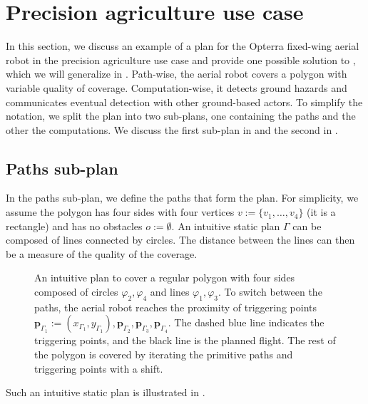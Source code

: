 \section{Precision agriculture use case}
\label{sec:flight-plan}

In this section, we discuss an example of a plan for the Opterra fixed-wing aerial robot in the precision agriculture use case and provide one possible solution to , which we will generalize in . Path-wise, the aerial robot covers a polygon with variable quality of coverage. Computation-wise, it detects ground hazards and communicates eventual detection with other ground-based actors. To simplify the notation, we split the plan into two sub-plans, one containing the paths and the other the computations. We discuss the first sub-plan in  and the second in .

\subsection{Paths sub-plan}
\label{sec:path-wise}

In the paths sub-plan, we define the paths that form the plan. For simplicity, we assume the polygon has four sides with four vertices $v:=\{v_1,\dots,v_4\}$ (it is a rectangle) and has no obstacles $o:=\emptyset$. An intuitive static plan $\Gamma$ can be composed of lines connected by circles. The distance between the lines can then be a measure of the quality of the coverage.
\begin{figure}[h!]
  \centering
  
  \caption[Intuitive plan to cover a regular polygon with four sides]{An intuitive plan to cover a regular polygon with four sides composed of circles $\varphi_2,\varphi_4$ and lines $\varphi_1,\varphi_3$. To switch between the paths, the aerial robot reaches the proximity of triggering points $\mathbf{p}_{\Gamma_1}:=(x_{\Gamma_1},y_{\Gamma_1}),\mathbf{p}_{\Gamma_2},\mathbf{p}_{\Gamma_3},\mathbf{p}_{\Gamma_4}$. The dashed blue line indicates the triggering points, and the black line is the planned flight. The rest of the polygon is covered by iterating the primitive paths and triggering points with a shift.}
  \label{fig:bm-like_pb}
\end{figure}
Such an intuitive static plan is illustrated in .

